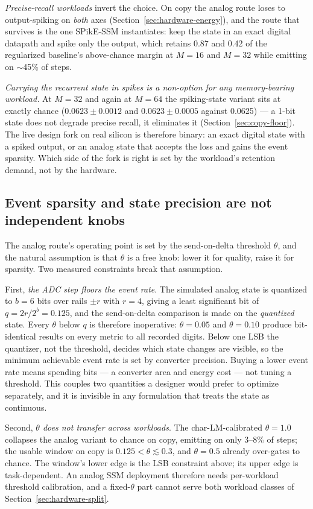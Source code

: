 \emph{Precise-recall workloads} invert the choice. On copy the analog route loses to
output-spiking on \emph{both} axes (Section~\ref{sec:hardware-energy}), and the route that
survives is the one SPikE-SSM instantiates: keep the state in an exact
digital datapath and spike only the output, which retains 0.87 and 0.42 of the regularized
baseline's above-chance margin at $M{=}16$ and $M{=}32$ while emitting on $\sim$45\% of steps.

\emph{Carrying the recurrent state in spikes is a non-option for any memory-bearing
workload.} At $M{=}32$ and again at $M{=}64$ the spiking-state variant sits at exactly
chance ($0.0623\pm0.0012$ and $0.0623\pm0.0005$ against 0.0625) --- a 1-bit state does not
degrade precise recall, it eliminates it (Section~\ref{sec:copy-floor}). The live design
fork on real silicon is therefore binary: an exact digital state with a spiked output, or an
analog state that accepts the loss and gains the event sparsity. Which side of the fork is
right is set by the workload's retention demand, not by the hardware.

\subsection{Event sparsity and state precision are not independent knobs}
\label{sec:hardware-adc}

The analog route's operating point is set by the send-on-delta threshold $\theta$, and the
natural assumption is that $\theta$ is a free knob: lower it for quality, raise it for
sparsity. Two measured constraints break that assumption.

First, \emph{the ADC step floors the event rate}. The simulated analog state is quantized to
$b{=}6$ bits over rails $\pm r$ with $r{=}4$, giving a least significant bit of
$q = 2r/2^{b} = 0.125$, and the send-on-delta comparison is made on the \emph{quantized}
state. Every $\theta$ below $q$ is therefore inoperative: $\theta{=}0.05$ and
$\theta{=}0.10$ produce bit-identical results on every metric to all recorded digits. Below
one LSB the quantizer, not the threshold, decides which state changes are visible, so the
minimum achievable event rate is set by converter precision. Buying a lower event rate means
spending bits --- a converter area and energy cost --- not tuning a threshold. This couples
two quantities a designer would prefer to optimize separately, and it is invisible in any
formulation that treats the state as continuous.

Second, \emph{$\theta$ does not transfer across workloads}. The char-LM-calibrated
$\theta{=}1.0$ collapses the analog variant to chance on copy, emitting on only 3--8\% of
steps; the usable window on copy is $0.125 < \theta \lesssim 0.3$, and $\theta{=}0.5$
already over-gates to chance. The window's lower edge is the LSB constraint above; its upper
edge is task-dependent. An analog SSM deployment therefore needs per-workload threshold
calibration, and a fixed-$\theta$ part cannot serve both workload classes of
Section~\ref{sec:hardware-split}.

